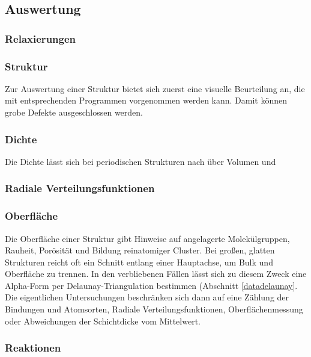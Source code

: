 \subsection{Auswertung}

\subsubsection{Relaxierungen}

\subsubsection{Struktur}

Zur Auswertung einer Struktur bietet sich zuerst eine visuelle Beurteilung an, die mit entsprechenden Programmen vorgenommen werden kann.
Damit können grobe Defekte ausgeschlossen werden.

\subsubsection{Dichte}

Die Dichte lässt sich bei periodischen Strukturen nach über Volumen und 

\subsubsection{Radiale Verteilungsfunktionen}

\subsubsection{Oberfläche}

Die Oberfläche einer Struktur gibt Hinweise auf angelagerte Molekülgruppen, Rauheit, Porösität und Bildung reinatomiger Cluster.
Bei großen, glatten Strukturen reicht oft ein Schnitt entlang einer Hauptachse, um Bulk und Oberfläche zu trennen.
In den verbliebenen Fällen lässt sich zu diesem Zweck eine Alpha-Form per Delaunay-Triangulation bestimmen (Abschnitt \ref{datadelaunay}.
Die eigentlichen Untersuchungen beschränken sich dann auf eine Zählung der Bindungen und Atomsorten, Radiale Verteilungsfunktionen, Oberflächenmessung oder Abweichungen der Schichtdicke vom Mittelwert.

\subsubsection{Reaktionen}



